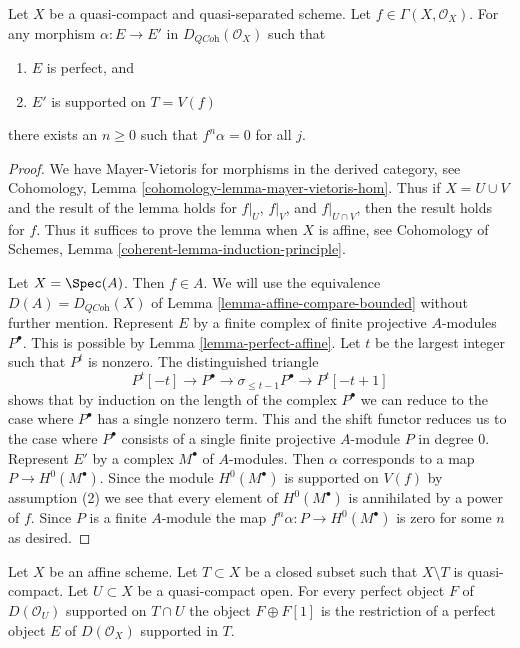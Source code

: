 \begin{lemma}
\label{lemma-perfect-into-support-on-T}
Let $X$ be a quasi-compact and quasi-separated scheme.
Let $f \in \Gamma(X, \mathcal{O}_X)$.
For any morphism $\alpha : E \to E'$ in
$D_{\textit{QCoh}}(\mathcal{O}_X)$ such that
\begin{enumerate}
\item $E$ is perfect, and
\item $E'$ is supported on $T = V(f)$
\end{enumerate}
there exists an $n \geq 0$ such that $f^n \alpha  = 0$ for all $j$.
\end{lemma}

\begin{proof}
We have Mayer-Vietoris for morphisms in the derived category, see
Cohomology, Lemma \ref{cohomology-lemma-mayer-vietoris-hom}.
Thus if $X = U \cup V$ and the result of the lemma holds
for $f|_U$, $f|_V$, and $f|_{U \cap V}$, then the result holds for $f$.
Thus it suffices to prove the lemma when $X$ is affine, see
Cohomology of Schemes, Lemma \ref{coherent-lemma-induction-principle}.

\medskip\noindent
Let $X = \Spec(A)$. Then $f \in A$. We will
use the equivalence $D(A) = D_{\textit{QCoh}}(X)$ of
Lemma \ref{lemma-affine-compare-bounded}
without further mention.
Represent $E$ by a finite complex of finite projective $A$-modules
$P^\bullet$. This is possible by Lemma \ref{lemma-perfect-affine}.
Let $t$ be the largest integer such that $P^t$ is nonzero.
The distinguished triangle
$$
P^t[-t] \to P^\bullet \to \sigma_{\leq t - 1}P^\bullet \to P^t[-t + 1]
$$
shows that by induction on the length of the complex $P^\bullet$
we can reduce to the case where $P^\bullet$ has a single nonzero term.
This and the shift functor reduces us to the case where $P^\bullet$
consists of a single finite projective $A$-module $P$ in degree $0$.
Represent $E'$ by a complex $M^\bullet$ of $A$-modules.
Then $\alpha$ corresponds to a map $P \to H^0(M^\bullet)$.
Since the module $H^0(M^\bullet)$ is supported on $V(f)$ by assumption (2)
we see that every element of $H^0(M^\bullet)$ is annihilated by a power
of $f$. Since $P$ is a finite $A$-module the map
$f^n\alpha : P \to H^0(M^\bullet)$ is zero for some $n$ as desired.
\end{proof}

\begin{lemma}
\label{lemma-lift-perfect-complex-plus-shift-support}
Let $X$ be an affine scheme. Let $T \subset X$ be a closed subset
such that $X \setminus T$ is quasi-compact. Let $U \subset X$ be a
quasi-compact open. For every perfect object $F$ of $D(\mathcal{O}_U)$
supported on $T \cap U$ the object $F \oplus F[1]$ is the restriction of
a perfect object $E$ of $D(\mathcal{O}_X)$ supported in $T$.
\end{lemma}

